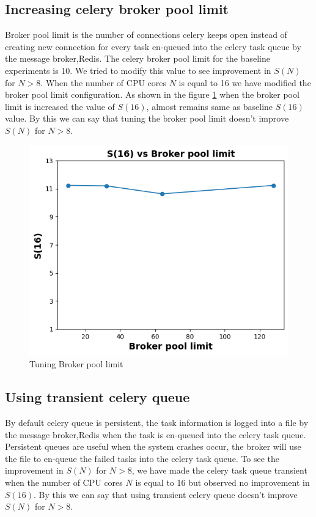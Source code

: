 \documentclass[sigconf]{acmart}
\begin{document}
\subsection{Increasing celery broker pool limit}
Broker pool limit is the number of connections celery keeps open instead of creating new connection for every task en-queued into the celery task queue by the message broker,Redis. The celery broker pool limit for the baseline experiments is 10. We tried to modify this value to see improvement in $S(N)$ for $N>8$. When the number of CPU cores $N$ is equal to 16 we have modified the broker pool limit configuration. As shown in the figure \ref{broker_pool_limit} when the broker pool limit is increased the value of $S(16)$, almost remains same as baseline $S(16)$ value. By this we can say that tuning the broker pool limit doesn't improve  $S(N)$ for $N>8$.
\begin{figure}[!htb]
  \centering
  \includegraphics[width=\linewidth]{Pictures/broker_limit.png}
  \caption{Tuning Broker pool limit}
  \label{broker_pool_limit}
\end{figure}
\subsection{Using transient celery queue}
By default celery queue is persistent, the task information is logged
into a file by the message broker,Redis when the task is en-queued into the celery task queue. Persistent queues are useful when the system crashes occur, the broker will  use the file to en-queue the failed tasks into the celery 
task queue. To see the improvement in $S(N)$ for $N>8$, we have made the celery task queue transient when the number of CPU cores $N$ is equal to 16 but observed no improvement in $S(16)$. By this we can say that using transient celery queue doesn't improve  $S(N)$ for $N>8$.
\end{document}
